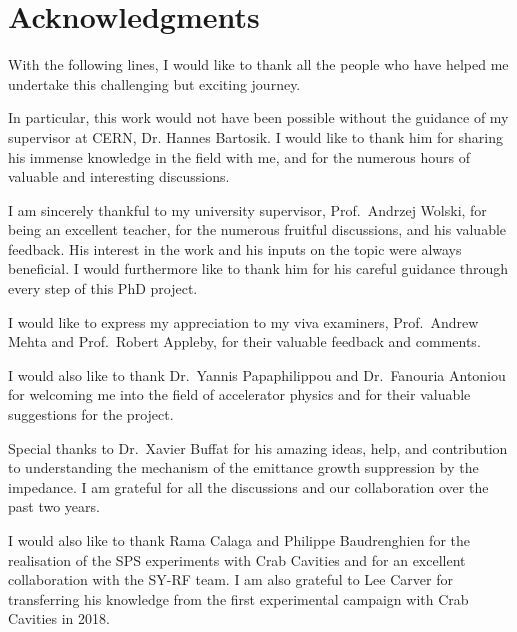 \cleardoublepage
\chapter*{Acknowledgments}
\thispagestyle{simple} %



With the following lines, I would like to thank all the people who have helped me undertake this challenging but exciting journey.

In particular, this work would not have been possible without the guidance of my supervisor at CERN, Dr. Hannes Bartosik. I would like to thank him for sharing his immense knowledge in the field with me, and for the numerous hours of valuable and interesting discussions.


I am sincerely thankful to my university supervisor, Prof.~Andrzej Wolski, for being an excellent teacher, for the numerous fruitful discussions, and his valuable feedback. His interest in the work and his inputs on the topic were always beneficial. I would furthermore like to thank him for his careful guidance through every step of this PhD project. 

I would like to express my appreciation to my viva examiners, Prof.~Andrew Mehta and Prof.~Robert Appleby, for their valuable feedback and comments.

I would also like to thank Dr.~Yannis Papaphilippou and Dr.~Fanouria Antoniou for welcoming me into the field of accelerator physics and for their valuable suggestions for the project.

Special thanks to Dr.~Xavier Buffat for his amazing ideas, help, and contribution to understanding the mechanism of the emittance growth suppression by the impedance. I am grateful for all the discussions and our collaboration over the past two years. 

I would also like to thank Rama Calaga and Philippe Baudrenghien for the realisation of the SPS experiments with Crab Cavities and for an excellent collaboration with the SY-RF team. I am also grateful to Lee Carver for transferring his knowledge from the first experimental campaign with Crab Cavities in 2018.

